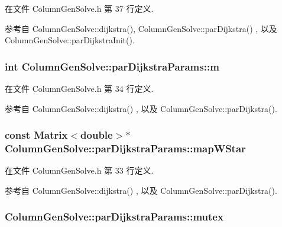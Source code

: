 在文件 Column\+Gen\+Solve.\+h 第 37 行定义.



参考自 Column\+Gen\+Solve\+::dijkstra(), Column\+Gen\+Solve\+::par\+Dijkstra() , 以及 Column\+Gen\+Solve\+::par\+Dijkstra\+Init().

\subsubsection[{\texorpdfstring{m}{m}}]{\setlength{\rightskip}{0pt plus 5cm}int Column\+Gen\+Solve\+::par\+Dijkstra\+Params\+::m}\hypertarget{structColumnGenSolve_1_1parDijkstraParams_a20f153fdd04ede56c8ec19f155e1e423}{}\label{structColumnGenSolve_1_1parDijkstraParams_a20f153fdd04ede56c8ec19f155e1e423}


在文件 Column\+Gen\+Solve.\+h 第 34 行定义.



参考自 Column\+Gen\+Solve\+::dijkstra() , 以及 Column\+Gen\+Solve\+::par\+Dijkstra().

\subsubsection[{\texorpdfstring{map\+W\+Star}{mapWStar}}]{\setlength{\rightskip}{0pt plus 5cm}const {\bf Matrix}$<$double$>$$\ast$ Column\+Gen\+Solve\+::par\+Dijkstra\+Params\+::map\+W\+Star}\hypertarget{structColumnGenSolve_1_1parDijkstraParams_ae0b35a1ba11e00c8ce3113b2a174042d}{}\label{structColumnGenSolve_1_1parDijkstraParams_ae0b35a1ba11e00c8ce3113b2a174042d}


在文件 Column\+Gen\+Solve.\+h 第 33 行定义.



参考自 Column\+Gen\+Solve\+::dijkstra() , 以及 Column\+Gen\+Solve\+::par\+Dijkstra().

\subsubsection[{\texorpdfstring{mutex}{mutex}}]{ Column\+Gen\+Solve\+::par\+Dijkstra\+Params\+::mutex}\hypertarget{structColumnGenSolve_1_1parDijkstraParams_afd187d09e520e40b13939295dc60f208}{}\label{structColumnGenSolve_1_1parDijkstraParams_afd187d09e520e40b13939295dc60f208}


